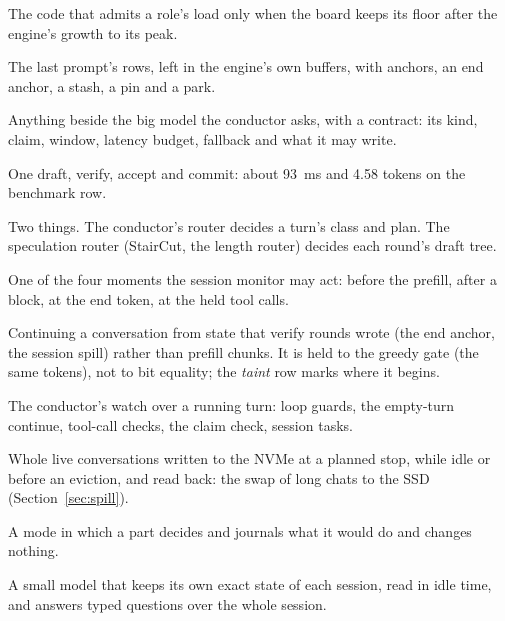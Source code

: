\begin{description}[style=unboxed, leftmargin=0pt, itemsep=.5ex, font=\normalfont\bfseries]
\item[residency planner] The code that admits a role's load only when the board keeps its floor after the engine's growth to its peak.

\item[resident prefix] The last prompt's rows, left in the engine's own buffers, with anchors, an end anchor, a stash, a pin and a park.

\item[role] Anything beside the big model the conductor asks, with a contract: its kind, claim, window, latency budget, fallback and what it may write.

\item[round] One draft, verify, accept and commit: about 93~ms and 4.58 tokens on the benchmark row.

\item[router] Two things. The conductor's router decides a turn's class and plan. The speculation router (StairCut, the length router) decides each round's draft tree.

\item[safe point] One of the four moments the session monitor may act: before the prefill, after a block, at the end token, at the held tool calls.

\item[session resume] Continuing a conversation from state that verify rounds wrote (the end anchor, the session spill) rather than prefill chunks. It is held to the greedy gate (the same tokens), not to bit equality; the \emph{taint} row marks where it begins.

\item[session monitor] The conductor's watch over a running turn: loop guards, the empty-turn continue, tool-call checks, the claim check, session tasks.

\item[session spill] Whole live conversations written to the NVMe at a planned stop, while idle or before an eviction, and read back: the swap of long chats to the SSD (Section~\ref{sec:spill}).

\item[shadow] A mode in which a part decides and journals what it would do and changes nothing.

\item[shadow reader] A small model that keeps its own exact state of each session, read in idle time, and answers typed questions over the whole session.


\end{description}

